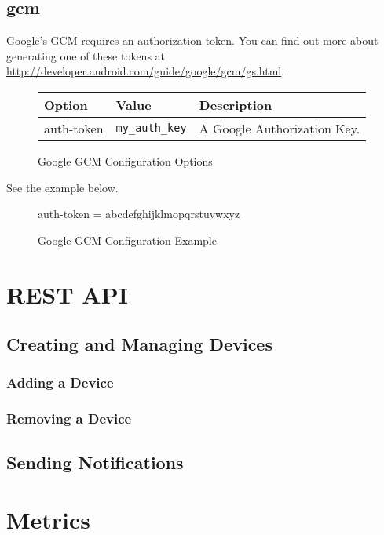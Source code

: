 \documentclass[12pt]{article}
\begin{document}
\subsection{gcm}

Google's GCM requires an authorization token.
You can find out more about generating one of these tokens at \url{http://developer.android.com/guide/google/gcm/gs.html}.

\begin{figure}[h!]
\centering
\begin{tabular}{l l l}
\hline
Option & Value & Description \\
\hline
auth-token & \verb|my_auth_key| & A Google Authorization Key. \\
\hline
\end{tabular}
\caption{Google GCM Configuration Options}
\end{figure}

See the example below.

\begin{figure}[h!]
\begin{Terminal}
[gcm]
auth-token = abcdefghijklmopqrstuvwxyz
\end{Terminal}
\caption{Google GCM Configuration Example}
\end{figure}

\section{REST API}

\subsection{Creating and Managing Devices}

\subsubsection{Adding a Device}

\subsubsection{Removing a Device}

\subsection{Sending Notifications}

\section{Metrics}
\end{document}
